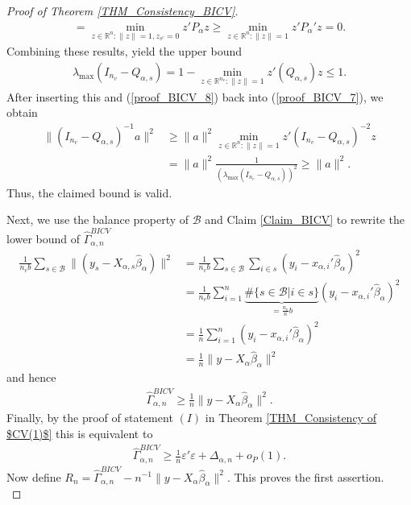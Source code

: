\documentclass[Research_Module_ES.tex]{subfiles}
\begin{document}
\begin{proof}[Proof of Theorem \ref{THM_Consistency_BICV}]
\begin{align*}
	= \min_{z\in \mathbb{R}^n : \lVert z\rVert=1, z_{s^c}=0}z'P_\alpha z
	\ge \min_{z\in \mathbb{R}^n : \lVert z\rVert=1}z'P_\alpha'z = 0.
	\end{align*}
	Combining these results, yield the upper bound
	\begin{align*}
	\lambda_{\max}(I_{n_v}-Q_{\alpha,s})
	=1- \min_{z\in \mathbb{R}^{n_v} : \lVert z\rVert=1}z'(Q_{\alpha,s})z \le 1.
	\end{align*}
	After inserting this and (\ref{proof_BICV_8}) back into (\ref{proof_BICV_7}), we obtain
	\begin{align*}
	\lVert (I_{n_v}-Q_{\alpha,s})^{-1} a\rVert ^2 
	&\ge \lVert a\rVert^2 \min_{z\in \mathbb{R}^n : \lVert z\rVert=1}z'(I_{n_v}-Q_{\alpha,s})^{-2}z\\
	&=  \lVert a\rVert^2\frac{1}{(\lambda_{\max}(I_{n_v}-Q_{\alpha,s}))^2} 
	\ge \lVert a\rVert^2.
	\end{align*}
	Thus, the claimed bound is valid.
	
	Next, we use the balance property of $\mathcal{B}$ and Claim \ref{Claim_BICV} to rewrite the lower bound of $\hat{\Gamma}_{\alpha,n}^{BICV}$ 
	\begin{align*}
	\frac{1}{n_vb}\sum_{s\in \mathcal{B}}\lVert (y_s-X_{\alpha,s}\hat{\beta}_\alpha)\rVert^2
	&= \frac{1}{n_vb}\sum_{s\in \mathcal{B}}\sum_{i \in s} (y_i-x_{\alpha,i}'\hat{\beta}_\alpha)^2\\
	&= \frac{1}{n_vb}\sum_{i=1}^n \underbrace{\#\{s\in \mathcal{B}| i\in s\}}_{=\frac{n_v}{n}b} (y_i-x_{\alpha,i}'\hat{\beta}_\alpha)^2\\
	&=\frac{1}{n}\sum_{i=1}^n(y_i-x_{\alpha,i}'\hat{\beta}_\alpha)^2\\
	&= \frac{1}{n} \lVert y-X_\alpha\hat{\beta}_\alpha\rVert ^2
	\end{align*}
	and hence
	\begin{align*}
	\hat{\Gamma}_{\alpha,n}^{BICV} \ge \frac{1}{n} \lVert y-X_\alpha\hat{\beta}_\alpha\rVert ^2.
	\end{align*}
	Finally, by the proof of statement $(I)$ in Theorem \ref{THM_Consistency of $CV(1)$} this is equivalent to
	\begin{align*}
	\hat{\Gamma}_{\alpha,n}^{BICV} \ge \frac{1}{n}\varepsilon'\varepsilon + \Delta_{\alpha,n} + o_P(1).
	\end{align*}
	Now define $R_n = \hat{\Gamma}_{\alpha,n}^{BICV} - n^{-1}\lVert y-X_{\alpha}\hat{\beta}_\alpha\rVert^2$. This proves the first assertion.
	\\
	

\end{proof}
\end{document}
